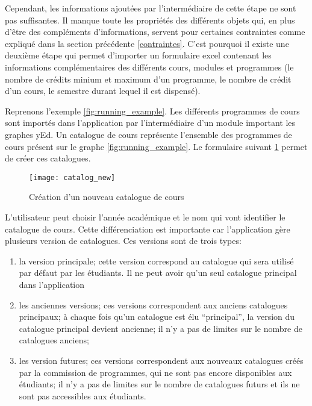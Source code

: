 Cependant, les informations ajoutées par l'intermédiaire de cette étape ne sont pas suffisantes. Il manque toute les propriétés des différents objets qui, en plus d'être des compléments d'informations, servent pour certaines contraintes comme expliqué dans la section précédente \ref{contraintes}. C'est pourquoi il existe une deuxième étape qui permet d'importer un formulaire excel contenant les informations complémentaires des différents cours, modules et programmes (le nombre de crédits minium et maximum d'un programme, le nombre de crédit d'un cours, le semestre durant lequel il est dispensé). 


Reprenons  l'exemple \ref{fig:running_example}. Les différents programmes de cours sont importés dans l'application par l'intermédiaire d'un module important les graphes yEd. Un catalogue de cours représente l'ensemble des programmes de cours présent sur le graphe \ref{fig:running_example}. Le formulaire suivant \ref{fig:catalog_new_page} permet de créer ces catalogues. 

\begin{figure}
\centering
\caption{Création d'un nouveau catalogue de cours}
\label{fig:catalog_new_page}
\texttt{[image: catalog\_new]}
\end{figure}


L'utilisateur peut choisir l'année académique et le nom qui vont identifier le catalogue de cours. Cette différenciation est importante car l'application gère plusieurs version de catalogues. Ces versions sont de trois types: 

\begin{enumerate}
\item la version principale; cette version correspond au catalogue qui sera utilisé par défaut par les étudiants. Il ne peut avoir qu'un seul catalogue principal dans l'application
\item les anciennes versions; ces versions correspondent aux anciens catalogues principaux; à chaque fois qu'un catalogue est élu ``principal'', la version du catalogue principal devient ancienne; il n'y a pas de limites sur le nombre de catalogues anciens;
\item les version futures; ces versions correspondent aux nouveaux catalogues créés par la commission de programmes, qui ne sont pas encore disponibles aux étudiants; il n'y a pas de limites sur le nombre de catalogues futurs et ils ne sont pas accessibles aux étudiants. 
\end{enumerate}

